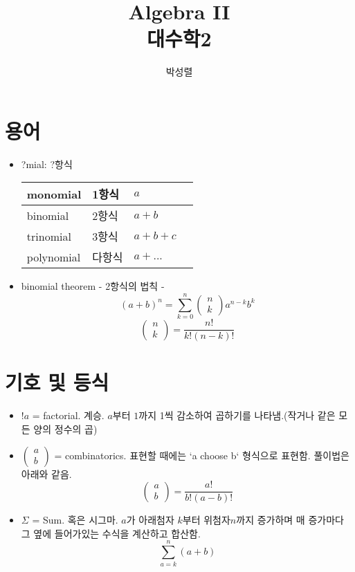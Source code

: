 \documentclass{article}
\title{Algebra II \\대수학2}
\author{박성렬}
\begin{document}
\maketitle

\section {용어}
\begin {itemize}
\item ?mial: ?항식
\begin {tabular} {| l | l | l | l |}
\hline
monomial & 1항식 & $a$\\
\hline
binomial & 2항식 & $a+b$\\
\hline
trinomial & 3항식 & $a+b+c$\\
\hline
polynomial & 다항식 & $a+...$\\
\hline
\end {tabular}

\item binomial theorem - 2항식의 법칙 -
$$(a+b)^{n}= \sum_{k=0}^{n} \begin{pmatrix}n \\ k \end{pmatrix} a^{n-k}b^{k}$$
$$\begin{pmatrix} n \\k \end{pmatrix}=\dfrac{n!}{k!(n-k)!} $$
\end {itemize}

\section {기호 및 등식}
\begin {itemize}
\item $!a$ = factorial. 계승. $a$부터 $1$까지 1씩 감소하여 곱하기를 나타냄.(작거나 같은 모든 양의 정수의 곱)
\item $\begin{pmatrix} a \\ b \end{pmatrix}$ = combinatorics. 표현할 때에는 `a choose b` 형식으로 표현함. 풀이법은 아래와 같음.
$$\begin{pmatrix} a\\b \end{pmatrix} = \dfrac{a!}{b!(a-b)!}$$
\item $\Sigma$ = Sum. 혹은 시그마. $a$가 아래첨자 $k$부터 위첨자$n$까지 증가하며 매 증가마다 그 옆에 들어가있는 수식을 계산하고 합산함.
$$ \sum_{a=k}^{n} (a+b) $$
\end {itemize}
\end{document}
